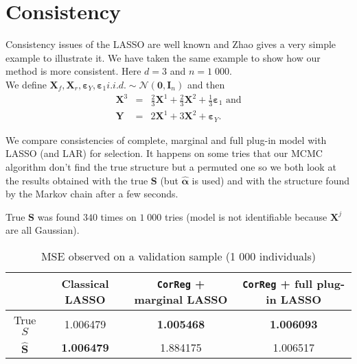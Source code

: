 \documentclass[12pt,a4paper]{report}
\begin{document}
	

	\section{Consistency}\label{consistency}
		Consistency issues of the LASSO are well known and Zhao \cite{Zhao2006MSC} gives a very simple example to illustrate it.
		We have taken the same example to show how our method is more consistent.
		Here $d=3$ and $n=1\;000$.\\
		We define $\boldsymbol{X}_{f}, \boldsymbol{X}_{r}, \boldsymbol{\varepsilon}_Y, \boldsymbol{\varepsilon}_{1} i.i.d. \sim \mathcal{N}(\boldsymbol{0},\boldsymbol{I}_n)$ and then \\
		\begin{eqnarray}
		\boldsymbol{X}^3&=&\frac{2}{3}\boldsymbol{X}^1+\frac{2}{3}\boldsymbol{X}^2+\frac{1}{3}\boldsymbol{\varepsilon}_1 \textrm{ and} \\
		\boldsymbol{Y}&=&2\boldsymbol{X}^1+3\boldsymbol{X}^2+\boldsymbol{\varepsilon}_Y.
		\end{eqnarray}
		
		
		We compare consistencies of complete, marginal and full plug-in model with LASSO (and LAR) for selection.
		It happens on some tries that our MCMC algorithm don't find the true structure but a permuted one so we both look at the results obtained with the true $\boldsymbol{S}$ (but $\hat{\boldsymbol{\alpha}}$ is used) and with the structure found by the Markov chain after a few seconds.
		
		True $\boldsymbol{S}$ was found $340$ times on $1\;000$ tries (model is not identifiable because $\boldsymbol{X}^j$ are all Gaussian).
		
		\begin{table}[h!]
		\centering
		\begin{tabular}{|c|c|c|c|}
		\hline 
		 & Classical LASSO & {\tt CorReg} + marginal LASSO& {\tt CorReg} + full plug-in LASSO\\ 
		\hline 
		True $S$ &  1.006479 & \textbf{1.005468} & \textbf{1.006093} \\ 
		\hline 
		$\hat{\boldsymbol{S}}$ & \textbf{1.006479} & 1.884175 & 1.006517 \\ 
		\hline 
		\end{tabular} 
		\caption{MSE observed on a validation sample (1 000 individuals)}
		\end{table}
\end{document}
